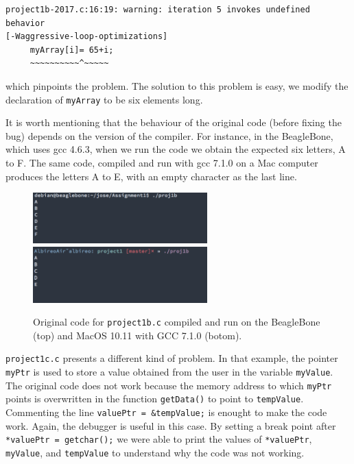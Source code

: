 \documentclass[letterpaper, 12pt]{article}
\begin{document}
\begin{verbatim}
project1b-2017.c:16:19: warning: iteration 5 invokes undefined behavior
[-Waggressive-loop-optimizations]
     myArray[i]= 65+i;
     ~~~~~~~~~~^~~~~~
\end{verbatim}

\noindent which pinpoints the problem. The solution to this problem is easy, we modify the declaration of \verb+myArray+ to be six elements long.

It is worth mentioning that the behaviour of the original code (before fixing the bug) depends on the version of the compiler. For instance, in the BeagleBone, which uses gcc 4.6.3, when we run the code we obtain the expected six letters, A to F. The same code, compiled and run with gcc 7.1.0 on a Mac computer produces the letters A to E, with an empty character as the last line.

\begin{figure}[!ht]
  \centering
  \captionsetup{width=0.8\textwidth}
  \includegraphics[width=0.6\textwidth]{images/proj1b_beagle.png}
  \includegraphics[width=0.6\textwidth]{images/proj1b_mac.png}
  \cprotect\caption{Original code for \verb+project1b.c+ compiled and run on the BeagleBone (top) and MacOS 10.11 with GCC 7.1.0 (botom).}
  \label{fig:proj1b}
\end{figure}

\verb+project1c.c+ presents a different kind of problem. In that example, the pointer \verb+myPtr+ is used to store a value obtained from the user in the variable \verb+myValue+. The original code does not work because the memory address to which \verb+myPtr+ points is overwritten in the function \verb+getData()+ to point to \verb+tempValue+. Commenting the line \verb+valuePtr = &tempValue;+ is enought to make the code work. Again, the debugger is useful in this case. By setting a break point after \verb+*valuePtr = getchar();+ we were able to print the values of \verb+*valuePtr+, \verb+myValue+, and \verb+tempValue+ to understand why the code was not working.
\end{document}
